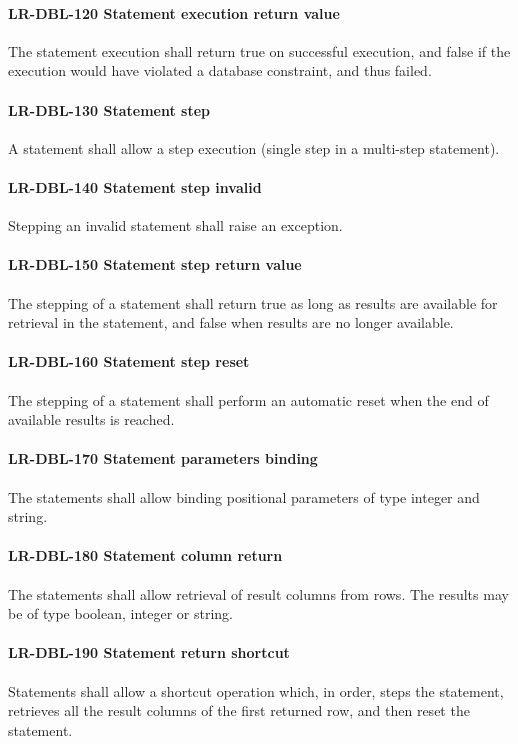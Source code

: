 \paragraph{LR-DBL-120 Statement execution return value}
The statement execution shall return true on successful execution, and
false if the execution would have violated a database constraint, and thus
failed.

\paragraph{LR-DBL-130 Statement step}
A statement shall allow a step execution (single step in a multi-step
statement).

\paragraph{LR-DBL-140 Statement step invalid}
Stepping an invalid statement shall raise an exception.

\paragraph{LR-DBL-150 Statement step return value}
The stepping of a statement shall return true as long as results
are available for retrieval in the statement, and false when results
are no longer available.

\paragraph{LR-DBL-160 Statement step reset}
The stepping of a statement shall perform an automatic reset when
the end of available results is reached.

\paragraph{LR-DBL-170 Statement parameters binding}
The statements shall allow binding positional parameters of type
integer and string.

\paragraph{LR-DBL-180 Statement column return}
The statements shall allow retrieval of result columns from rows.
The results may be of type boolean, integer or string.

\paragraph{LR-DBL-190 Statement return shortcut}
Statements shall allow a shortcut operation which, in order, steps
the statement, retrieves all the result columns of the first returned
row, and then reset the statement.

